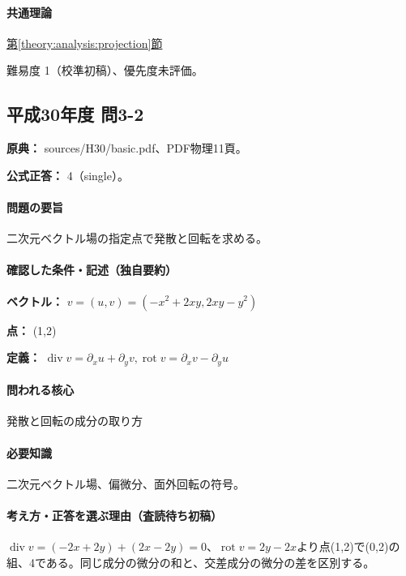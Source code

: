 \paragraph{共通理論} \hyperref[theory:analysis:projection]{第\ref*{theory:analysis:projection}節}

\par 難易度 1（校準初稿）、優先度未評価。

\subsection{平成30年度 問3-2}
\label{q:h30-reg-basic-3-2}

\noindent\textbf{原典：} sources/H30/basic.pdf、PDF物理11頁。

\textbf{公式正答：} 4（single）。

\paragraph{問題の要旨} 二次元ベクトル場の指定点で発散と回転を求める。

\paragraph{確認した条件・記述（独自要約）}\mbox{}\par

\noindent\textbf{ベクトル：} \(v=(u,v)=(-x^2+2xy,2xy-y^2)\)\par

\noindent\textbf{点：} (1,2)\par

\noindent\textbf{定義：} \(\operatorname{div}v=\partial_xu+\partial_yv,\operatorname{rot}v=\partial_xv-\partial_yu\)\par

\paragraph{問われる核心} 発散と回転の成分の取り方

\paragraph{必要知識} 二次元ベクトル場、偏微分、面外回転の符号。

\paragraph{考え方・正答を選ぶ理由（査読待ち初稿）} \(\operatorname{div}v=(-2x+2y)+(2x-2y)=0\)、\(\operatorname{rot}v=2y-2x\)より点(1,2)で(0,2)の組、4である。同じ成分の微分の和と、交差成分の微分の差を区別する。

